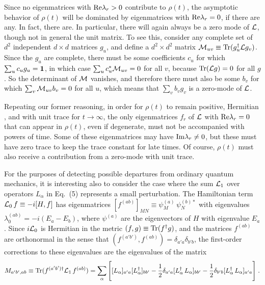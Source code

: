 Since no eigenmatrices with ${\rm Re}\lambda_r>0$ contribute to $\rho(t)$, the asymptotic behavior of $\rho(t)$ will be dominated by eigenmatrices with ${\rm Re}\lambda_r=0$, if there are any.  In fact, there are.  In particular,
there will again always be a zero mode of ${\cal L}$, though not in general the unit matrix.  To see this, consider any complete set of $d^2$ independent $d\times d$ matrices $g_u$, and define a $d^2\times d^2$ matrix ${\cal M}_{uv}\equiv {\rm Tr}(g_u^\dagger {\cal L} g_v)$.  Since the $g_u$ are complete, there must be some coefficients $c_u$ for which $\sum_u c_u g_u=\mbox{\boldmath{$1$}}$, in which case $\sum_u c^*_u {\cal M}_{uv}=0$ for all $v$, because ${\rm Tr}({\cal L}g)=0$ for all $g$.  So the determinant of ${\cal M}$ vanishes, and therefore there must also be some $b_v$ for which $\sum_v {\cal M}_{uv}b_v=0$ for all $u$, which means that $ \sum_v b_v g_v$ is a zero-mode of ${\cal L}$.  

Repeating our former reasoning, in order for $\rho(t)$ to remain positive, Hermitian , and with unit trace for $t\rightarrow\infty$, the only eigenmatrices  $f_r$ of ${\cal L}$  with ${\rm Re}\lambda_r=0$ that can appear in $\rho(t)$, even if degenerate, must  not be accompanied with powers of time.  Some of these eigenmatrices may have ${\rm Im}\lambda_r\neq 0$, but these  must have zero trace to keep the trace constant for late times.  Of course, $\rho(t)$ must also receive a contribution from a zero-mode with unit trace.



For the purposes of detecting possible departures from ordinary quantum mechanics, it is interesting also to consider the case where the sum ${\cal L}_1$ over operators $L_\alpha$ in Eq.~(5) represents a small perturbation.  The Hamiltonian term ${\cal L}_0\,f\equiv -i[H,f]$ has eigenmatrices $[f^{(ab)}]_{MN}\equiv \psi^{(a)}_M\,\psi^{(b)*}_N$ with eigenvalues $\lambda_0^{(ab)}=-i(E_a-E_b)$, where $\psi^{(a)}$ are the eigenvectors of $H$ with eigenvalue $E_a$.   Since $i{\cal L}_0$ is Hermitian in the metric 
$(f,g)\equiv {\rm Tr}(f^\dagger g)$, and the matrices $f^{(ab)}$ are orthonormal in the sense that $(f^{(a'b')},f^{(ab)})=\delta_{a'a}\delta_{b'b}$, the first-order corrections to these eigenvalues are the eigenvalues of the matrix 
\begin{equation}
M_{a'b',ab}\equiv{\rm Tr}(f^{(a'b')\dagger}{\cal L}_1\,f^{(ab)})=\sum_\alpha \Bigg[[L_\alpha]_{a'a}[L_\alpha^\dagger]_{bb'}-\frac{1}{2}\delta_{a'a}[L_\alpha^\dagger\,L_\alpha]_{bb'}-\frac{1}{2}\delta_{b'b}[L_\alpha^\dagger\,L_\alpha]_{a'a}\Bigg]\;.
\end{equation}

